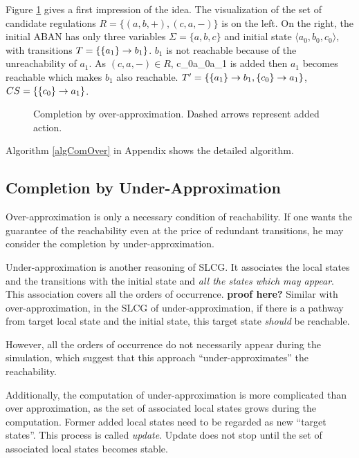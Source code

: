 Figure \ref{CompOv} gives a first impression of the idea.
The visualization of the set of candidate regulations $R=\{(a,b,+),(c,a,-)\}$ is on the left.
On the right, the initial ABAN has only three variables $\Sigma=\{a,b,c\}$ and initial state $\langle a_0,b_0,c_0\rangle$, with transitions $T=\{\acm{a_1}{b_0}{b_1}\}$.
$b_1$ is not reachable because of the unreachability of $a_1$.
As $(c,a,-)\in R$, \ac{c_0}{a_0}{a_1} is added then $a_1$ becomes reachable which makes $b_1$ also reachable.
$T'=\{\acm{a_1}{b_0}{b_1},\acm{c_0}{a_0}{a_1}\}$, $CS=\{\acm{c_0}{a_0}{a_1}\}$.

\begin{figure}[ht]
\centering

\caption[Completion by over-approximation]{Completion by over-approximation. Dashed arrows represent added action.}\label{CompOv}
\end{figure}
Algorithm \ref{algComOver} in Appendix shows the detailed algorithm.

\subsection{Completion by Under-Approximation}
Over-approximation is only a necessary condition of reachability.
If one wants the guarantee of the reachability even at the price of redundant transitions, he may consider the completion by under-approximation.

Under-approximation is another reasoning of SLCG. 
It associates the local states and the transitions with the initial state and \textit{all the states which may appear}.
This association covers all the orders of occurrence. \textbf{proof here?}
Similar with over-approximation, in the SLCG of under-approximation, if there is a pathway from target local state and the initial state, this target state \textit{should} be reachable.

However, all the orders of occurrence do not necessarily appear during the simulation, which suggest that this approach ``under-approximates'' the reachability.

Additionally, the computation of under-approximation is more complicated than over approximation, as the set of associated local states grows during the computation.
Former added local states need to be regarded as new ``target states''.
This process is called \textit{update}. 
Update does not stop until the set of associated local states becomes stable.


